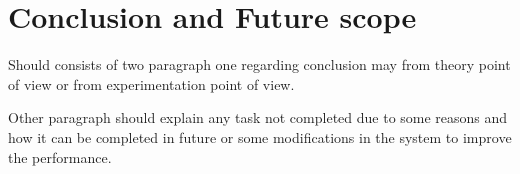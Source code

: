 
\chapter{Conclusion and Future scope}
Should consists of two paragraph one regarding conclusion may from theory point of view or from experimentation point of view. \par
     Other paragraph should explain any task not completed due to some reasons and how it can be completed in future or some modifications in the system to improve the performance.

